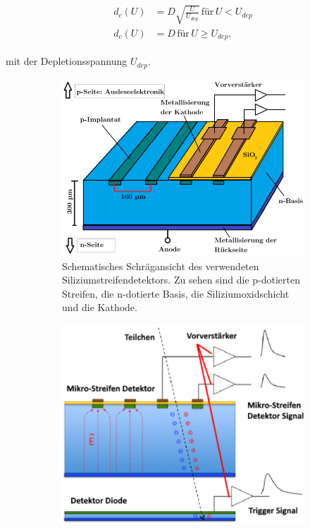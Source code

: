 \begin{align}
  \begin{split}
    d_c(U) &= D \sqrt{\frac{U}{U_{dep}}} \,\text{für}\, U < U_{dep} \\
    d_c(U) &= D  \,\text{für}\, U \geq U_{dep},
  \end{split}
\end{align}

mit der Depletionsspannung $U_{dep}$.


\begin{figure}[H]
  \begin{subfigure}{0.45\textwidth}
    \centering
    \includegraphics[width=\linewidth]{content/graphics/schrag.png}
    \caption{Schematisches Schrägansicht des verwendeten Siliziumstreifendetektors. Zu sehen sind die p-dotierten Streifen, die n-dotierte Basis, die Siliziumoxidschicht und die Kathode.}
    \label{fig:schragansicht}
  \end{subfigure}%
  \begin{subfigure}{0.45\textwidth}
    \centering
    \includegraphics[width=\linewidth]{content/graphics/trig.png}

\end{subfigure}
\end{figure}
